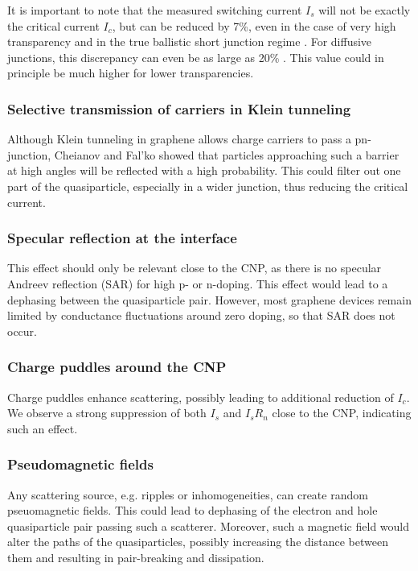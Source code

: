 It is important to note that the measured switching current $I_s$ will not be exactly the critical current $I_c$, but can be reduced by 7\%, even in the case of very high transparency and in the true ballistic short junction regime \cite{lee_ultimately_2015}.
For diffusive junctions, this discrepancy can even be as large as 20\% \cite{ke_critical_2016}.
This value could in principle be much higher for lower transparencies.

\subsubsection{Selective transmission of carriers in Klein tunneling}
Although Klein tunneling in graphene allows charge carriers to pass a pn-junction, Cheianov and Fal'ko showed that particles approaching such a barrier at high angles will be reflected with a high probability.\cite{chialvo_current-phase_2010}
This could filter out one part of the quasiparticle, especially in a wider junction, thus reducing the critical current.\cite{ben_shalom_quantum_2015}

\subsubsection{Specular reflection at the interface}
This effect should only be relevant close to the CNP, as there is no specular Andreev reflection (SAR) for high p- or n-doping.
This effect would lead to a dephasing between the quasiparticle pair.
However, most graphene devices remain limited by conductance fluctuations around zero doping, so that SAR does not occur.

\subsubsection{Charge puddles around the CNP}
Charge puddles enhance scattering, possibly leading to additional reduction of $I_c$.
We observe a strong suppression of both $I_s$ and $I_s R_n$ close to the CNP, indicating such an effect.

\subsubsection{Pseudomagnetic fields}
Any scattering source, e.g. ripples or inhomogeneities, can create random pseuomagnetic fields.
This could lead to dephasing of the electron and hole quasiparticle pair passing such a scatterer.
Moreover, such a magnetic field would alter the paths of the quasiparticles, possibly increasing the distance between them and resulting in pair-breaking and dissipation.


